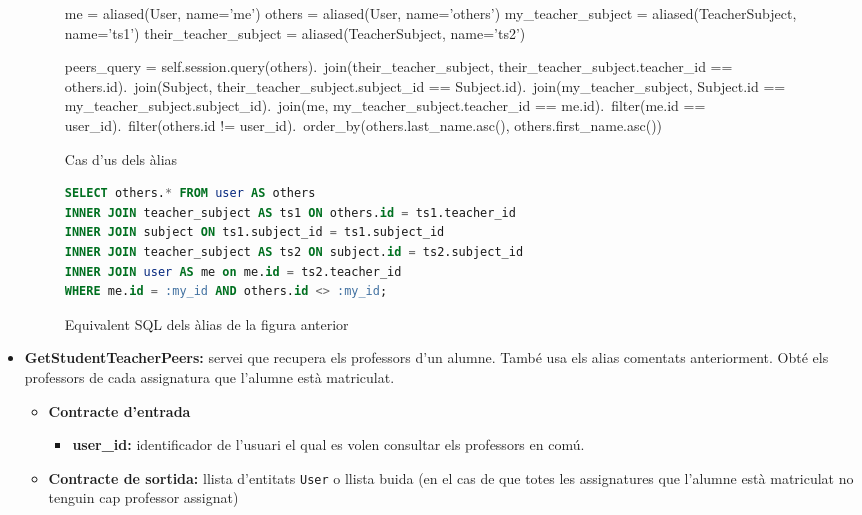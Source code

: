 \begin{itemize}
			\begin{figure}[h]
				\begin{python}
me = aliased(User, name='me')
others = aliased(User, name='others')
my_teacher_subject = aliased(TeacherSubject, name='ts1')
their_teacher_subject = aliased(TeacherSubject, name='ts2')

peers_query = self.session.query(others).\
	join(their_teacher_subject, their_teacher_subject.teacher_id == others.id).\
	join(Subject, their_teacher_subject.subject_id == Subject.id).\
	join(my_teacher_subject, Subject.id == my_teacher_subject.subject_id).\
	join(me, my_teacher_subject.teacher_id == me.id).\
	filter(me.id == user_id).\
	filter(others.id != user_id).\
	order_by(others.last_name.asc(), others.first_name.asc())
	 			\end{python}
	 			\label{fig:alias_sqlalchemy}
	 			\caption{Cas d'us dels àlias}
	 		\end{figure}
	 		
	 		\begin{figure}[h]
	 			\begin{lstlisting}[frame=single, language=SQL, frame=none]
SELECT others.* FROM user AS others
INNER JOIN teacher_subject AS ts1 ON others.id = ts1.teacher_id
INNER JOIN subject ON ts1.subject_id = ts1.subject_id
INNER JOIN teacher_subject AS ts2 ON subject.id = ts2.subject_id
INNER JOIN user AS me on me.id = ts2.teacher_id
WHERE me.id = :my_id AND others.id <> :my_id;
				\end{lstlisting}
				\label{fig:alias_sqlalchemy_sql}
				\caption{Equivalent \ac{SQL} dels àlias de la figura anterior}
			\end{figure}
			
			\item \textbf{GetStudentTeacherPeers:} servei que recupera els professors d'un alumne. També usa els alias comentats anteriorment. Obté els professors de cada assignatura que l'alumne està matriculat.
			
			\begin{itemize}
					\item \textbf{Contracte d'entrada}
						\begin{itemize}
							\item \textbf{user\_id:} identificador de l'usuari el qual es volen consultar els professors en comú.
						\end{itemize}
					\item \textbf{Contracte de sortida:} llista d'entitats \texttt{User} o llista buida (en el cas de que totes les assignatures que l'alumne està matriculat no tenguin cap professor assignat)
				\end{itemize}
				

\end{itemize}
